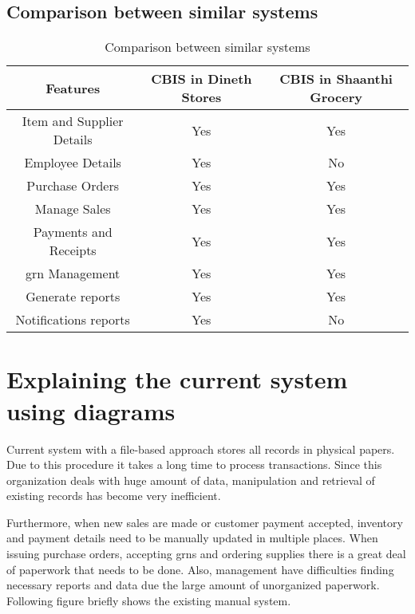 \documentclass[12pt]{report}
\begin{document}
\subsection{Comparison between similar systems}
\begin{table}[H]
	\centering
	\begin{tabular}{ |c|c|c| }
		\hline
		\bf{Features}             & \bf{CBIS in Dineth Stores} & \bf{CBIS in Shaanthi Grocery} \\
		\hline
		Item and Supplier Details & Yes                        & Yes                           \\
		\hline
		Employee Details          & Yes                        & No                            \\
		\hline
		Purchase Orders           & Yes                        & Yes                           \\
		\hline
		Manage Sales              & Yes                        & Yes                           \\
		\hline
		Payments and Receipts     & Yes                        & Yes                           \\
		\hline
		\acrshort{grn} Management & Yes                        & Yes                           \\
		\hline
		Generate reports          & Yes                        & Yes                           \\
		\hline
		Notifications reports     & Yes                        & No                            \\
		\hline
	\end{tabular}
	\caption{Comparison between similar systems}
\end{table}

\section{Explaining the current system using diagrams}
Current system with a file-based approach stores all records in physical papers. Due to this procedure it takes a long time to process transactions. Since this organization deals with huge amount of data, manipulation and retrieval of existing records has become very inefficient.

Furthermore, when new sales are made or customer payment accepted, inventory and payment details need to be manually updated in multiple places. When issuing purchase orders, accepting \acrshort{grn}s and ordering supplies there is a great deal of paperwork that needs to be done. Also, management have difficulties finding  necessary reports and data due the large amount of unorganized paperwork. Following figure briefly shows the existing manual system.
\end{document}
